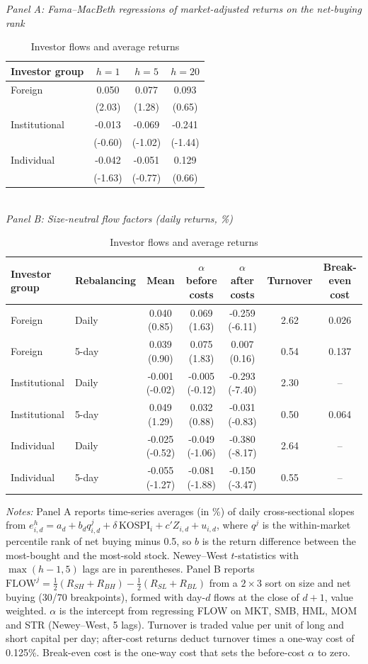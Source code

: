 \begin{table}[htbp]\centering
\caption{Investor flows and average returns}\label{tab:returns}
\small
\textit{Panel A: Fama--MacBeth regressions of market-adjusted returns on the net-buying rank}\\[3pt]
\begin{tabular}{lccc}\toprule
Investor group & $h=1$ & $h=5$ & $h=20$ \\\midrule
Foreign & 0.050 & 0.077 & 0.093 \\
 & (2.03) & (1.28) & (0.65) \\[2pt]
Institutional & -0.013 & -0.069 & -0.241 \\
 & (-0.60) & (-1.02) & (-1.44) \\[2pt]
Individual & -0.042 & -0.051 & 0.129 \\
 & (-1.63) & (-0.77) & (0.66) \\[2pt]
\bottomrule\end{tabular}\\[8pt]
\textit{Panel B: Size-neutral flow factors (daily returns, \%)}\\[3pt]
\footnotesize\setlength{\tabcolsep}{4pt}
\begin{tabular}{llccccc}\toprule
Investor group & Rebalancing & Mean & $\alpha$ before costs & $\alpha$ after costs & Turnover & Break-even cost \\\midrule
Foreign & Daily & 0.040 (0.85) & 0.069 (1.63) & -0.259 (-6.11) & 2.62 & 0.026 \\
Foreign & 5-day & 0.039 (0.90) & 0.075 (1.83) & 0.007 (0.16) & 0.54 & 0.137 \\
Institutional & Daily & -0.001 (-0.02) & -0.005 (-0.12) & -0.293 (-7.40) & 2.30 & -- \\
Institutional & 5-day & 0.049 (1.29) & 0.032 (0.88) & -0.031 (-0.83) & 0.50 & 0.064 \\
Individual & Daily & -0.025 (-0.52) & -0.049 (-1.06) & -0.380 (-8.17) & 2.64 & -- \\
Individual & 5-day & -0.055 (-1.27) & -0.081 (-1.88) & -0.150 (-3.47) & 0.55 & -- \\
\bottomrule\end{tabular}
\begin{minipage}{0.95\textwidth}\vspace{0.5em}\scriptsize
\textit{Notes:} Panel A reports time-series averages (in \%) of daily cross-sectional slopes from $e^h_{i,d}=a_d+b_d q^j_{i,d}+\delta\,\mathrm{KOSPI}_i+c'Z_{i,d}+u_{i,d}$, where $q^j$ is the within-market percentile rank of net buying minus 0.5, so $b$ is the return difference between the most-bought and the most-sold stock. Newey--West $t$-statistics with $\max(h-1,5)$ lags are in parentheses. Panel B reports $\mathrm{FLOW}^j=\tfrac12(R_{SH}+R_{BH})-\tfrac12(R_{SL}+R_{BL})$ from a $2\times3$ sort on size and net buying (30/70 breakpoints), formed with day-$d$ flows at the close of $d+1$, value weighted. $\alpha$ is the intercept from regressing FLOW on MKT, SMB, HML, MOM and STR (Newey--West, 5 lags). Turnover is traded value per unit of long and short capital per day; after-cost returns deduct turnover times a one-way cost of 0.125\%. Break-even cost is the one-way cost that sets the before-cost $\alpha$ to zero.
\end{minipage}\end{table}
